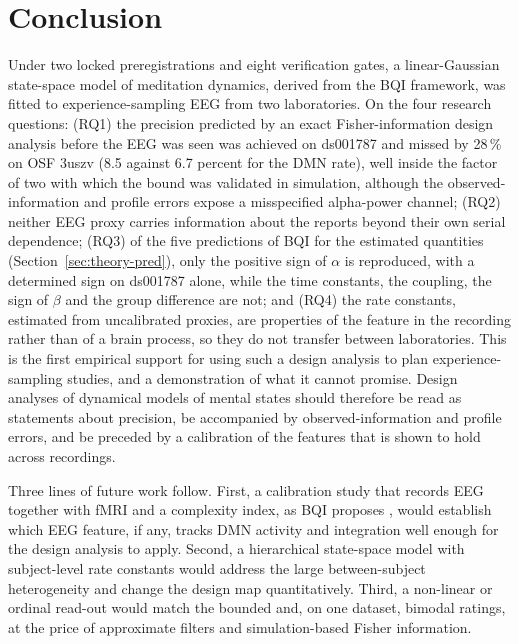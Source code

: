 \section{Conclusion}
\label{sec:conclusion}
Under two locked preregistrations and eight verification gates, a linear-Gaussian state-space model of meditation dynamics, derived from the BQI framework, was fitted to experience-sampling EEG from two laboratories. On the four research questions: (RQ1) the precision predicted by an exact Fisher-information design analysis before the EEG was seen was achieved on ds001787 and missed by 28\,\% on OSF 3uszv (8.5 against 6.7 percent for the DMN rate), well inside the factor of two with which the bound was validated in simulation, although the observed-information and profile errors expose a misspecified alpha-power channel; (RQ2) neither EEG proxy carries information about the reports beyond their own serial dependence; (RQ3) of the five predictions of BQI for the estimated quantities (Section~\ref{sec:theory-pred}), only the positive sign of $\alpha$ is reproduced, with a determined sign on ds001787 alone, while the time constants, the coupling, the sign of $\beta$ and the group difference are not; and (RQ4) the rate constants, estimated from uncalibrated proxies, are properties of the feature in the recording rather than of a brain process, so they do not transfer between laboratories. This is the first empirical support for using such a design analysis to plan experience-sampling studies, and a demonstration of what it cannot promise. Design analyses of dynamical models of mental states should therefore be read as statements about precision, be accompanied by observed-information and profile errors, and be preceded by a calibration of the features that is shown to hold across recordings.

Three lines of future work follow. First, a calibration study that records EEG together with fMRI and a complexity index, as BQI proposes \cite[Sec.~14]{BQI}, would establish which EEG feature, if any, tracks DMN activity and integration well enough for the design analysis to apply. Second, a hierarchical state-space model with subject-level rate constants would address the large between-subject heterogeneity and change the design map quantitatively. Third, a non-linear or ordinal read-out would match the bounded and, on one dataset, bimodal ratings, at the price of approximate filters and simulation-based Fisher information.
